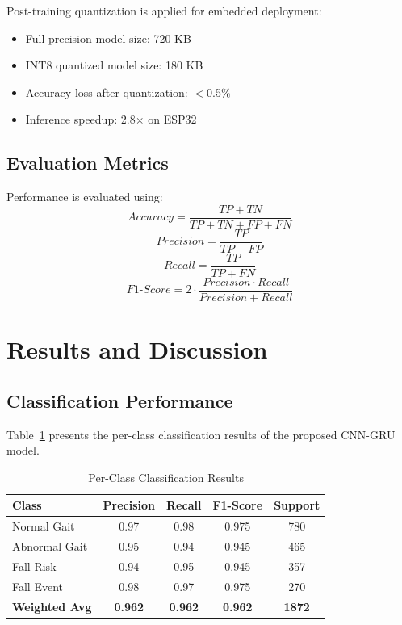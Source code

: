 \documentclass[conference]{IEEEtran}
\begin{document}
Post-training quantization is applied for embedded deployment:
\begin{itemize}
    \item Full-precision model size: 720 KB
    \item INT8 quantized model size: 180 KB
    \item Accuracy loss after quantization: $<$0.5\%
    \item Inference speedup: 2.8$\times$ on ESP32
\end{itemize}

\subsection{Evaluation Metrics}

Performance is evaluated using:
\begin{equation}
    Accuracy = \frac{TP + TN}{TP + TN + FP + FN}
\end{equation}
\begin{equation}
    Precision = \frac{TP}{TP + FP}
\end{equation}
\begin{equation}
    Recall = \frac{TP}{TP + FN}
\end{equation}
\begin{equation}
    F1\text{-}Score = 2 \cdot \frac{Precision \cdot Recall}{Precision + Recall}
\end{equation}

\section{Results and Discussion}

\subsection{Classification Performance}

Table~\ref{tab:classresults} presents the per-class classification results of the proposed CNN-GRU model.

\begin{table}[!t]
\caption{Per-Class Classification Results}
\label{tab:classresults}
\centering
\begin{tabular}{|l|c|c|c|c|}
\hline
\textbf{Class} & \textbf{Precision} & \textbf{Recall} & \textbf{F1-Score} & \textbf{Support} \\
\hline
Normal Gait & 0.97 & 0.98 & 0.975 & 780 \\
\hline
Abnormal Gait & 0.95 & 0.94 & 0.945 & 465 \\
\hline
Fall Risk & 0.94 & 0.95 & 0.945 & 357 \\
\hline
Fall Event & 0.98 & 0.97 & 0.975 & 270 \\
\hline
\textbf{Weighted Avg} & \textbf{0.962} & \textbf{0.962} & \textbf{0.962} & \textbf{1872} \\
\hline
\end{tabular}
\end{table}
\end{document}
